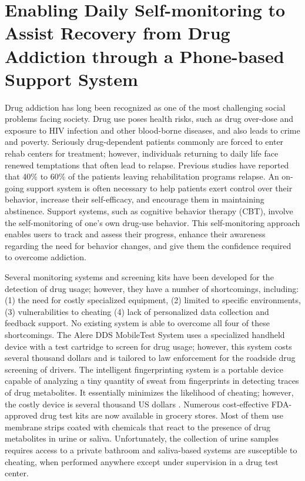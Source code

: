 \section{Enabling Daily Self-monitoring to Assist Recovery from Drug Addiction through a Phone-based Support System}

Drug addiction has long been recognized as one of the most challenging social problems facing society. Drug use poses health risks, such as drug over-dose and exposure to HIV infection and other blood-borne diseases, and also leads to crime and poverty. Seriously drug-dependent patients commonly are forced to enter rehab centers for treatment; however, individuals returning to daily life face renewed temptations that often lead to relapse. Previous studies \cite{addiction_relapse_rates} have reported that 40\% to 60\% of the patients leaving rehabilitation programs relapse. An on-going support system is often necessary to help patients exert control over their behavior, increase their self-efficacy, and encourage them in maintaining abstinence. Support systems, such as cognitive behavior therapy (CBT), involve the self-monitoring of one's own drug-use behavior. This self-monitoring approach enables users to track and assess their progress, enhance their awareness regarding the need for behavior changes, and give them the confidence required to overcome addiction.

Several monitoring systems and screening kits have been developed for the detection of drug usage; however, they have a number of shortcomings, including: (1) the need for costly specialized equipment, (2) limited to specific environments, (3) vulnerabilities to cheating (4) lack of personalized data collection and feedback support. No existing system is able to overcome all four of these shortcomings. The Alere DDS MobileTest System \cite{Moore2013} uses a specialized handheld device with a test cartridge to screen for drug usage; however, this system costs several thousand dollars and is tailored to law enforcement for the roadside drug screening of drivers. The intelligent fingerprinting system \cite{MobileDrugTesting} is a portable device capable of analyzing a tiny quantity of sweat from fingerprints in detecting traces of drug metabolites. It essentially minimizes the likelihood of cheating; however, the costly device is several thousand US dollars \cite{drugfingerprint}. Numerous cost-effective FDA-approved drug test kits are now available in grocery stores. Most of them use membrane strips \cite{drugscan,drugwipe} coated with chemicals that react to the presence of drug metabolites in urine or saliva. Unfortunately, the collection of urine samples requires access to a private bathroom and saliva-based systems are susceptible to cheating, when performed anywhere except under supervision in a drug test center.

